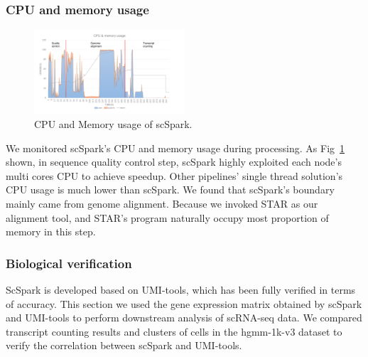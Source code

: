 \documentclass[conference]{IEEEtran}
\begin{document}
  \subsubsection{CPU and memory usage}
  \begin{figure}
    \includegraphics[width=0.5\textwidth]{fig8.pdf}
    \caption{CPU and Memory usage of scSpark.} \label{fig8}
  \end{figure}
  We monitored scSpark's CPU and memory usage during processing. 
  As Fig~\ref{fig8} shown, in sequence quality control step, scSpark highly exploited each node's multi cores CPU to achieve speedup. 
  Other pipelines' single thread solution's CPU usage is much lower than scSpark. 
  We found that scSpark's boundary mainly came from genome alignment.
  Because we invoked STAR as our alignment tool, and STAR's program naturally occupy most proportion of memory in this step.
  
  \subsubsection{Biological verification}
  ScSpark is developed based on UMI-tools, which has been fully verified in terms of accuracy. 
  This section we used the gene expression matrix obtained by scSpark and UMI-tools to perform downstream analysis of scRNA-seq data. 
  We compared transcript counting results and clusters of cells in the hgmm-1k-v3 dataset to verify the correlation between scSpark and UMI-tools. 
  
\end{document}
